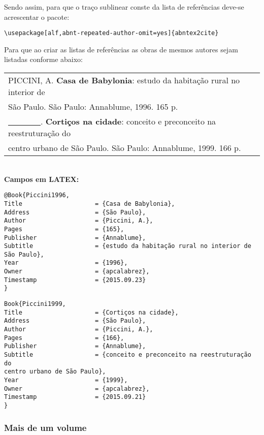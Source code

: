 Sendo assim, para que o traço sublinear conste da lista de referências deve-se acrescentar o pacote: 

\verb+\usepackage[alf,abnt-repeated-author-omit=yes]{abntex2cite}+

Para que ao criar as listas de referências as obras de mesmos autores sejam listadas conforme abaixo: \\

\begin{tabular}{|l|c|} \hline
	PICCINI, A. \textbf{Casa de Babylonia}: estudo da habitação rural no interior de \\São Paulo. São Paulo: Annablume, 1996. 165 p. \\
	
	\underline{\ \ \ \ \ \ \ \ }. \textbf{Cortiços na cidade}: conceito e preconceito na reestruturação do \\centro urbano de  São Paulo. São Paulo: Annablume, 1999. 166 p.   \\\hline
\end{tabular}\\

\textbf{Campos em LATEX:}

\begin{verbatim}
@Book{Piccini1996,
Title                    = {Casa de Babylonia},
Address                  = {São Paulo},
Author                   = {Piccini, A.},
Pages                    = {165},
Publisher                = {Annablume},
Subtitle                 = {estudo da habitação rural no interior de 
São Paulo},
Year                     = {1996},
Owner                    = {apcalabrez},
Timestamp                = {2015.09.23}
}
\end{verbatim}

\begin{verbatim}
Book{Piccini1999,
Title                    = {Cortiços na cidade},
Address                  = {São Paulo},
Author                   = {Piccini, A.},
Pages                    = {166},
Publisher                = {Annablume},
Subtitle                 = {conceito e preconceito na reestruturação do 
centro urbano de São Paulo},
Year                     = {1999},
Owner                    = {apcalabrez},
Timestamp                = {2015.09.21}
}

\end{verbatim}
\subsubsection{Mais de um volume}

